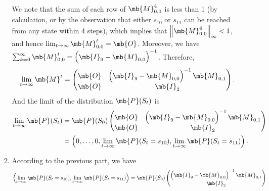 \begin{exercise}
\begin{enumerate}
\begin{solution}
\begin{enumerate}
\begin{align*}
                        \end{align*}
                        We note that the sum of each row of $\mb{M}_{0,0}^4$ is less than 1 (by calculation, or by the observation that either $s_{10}$ or $s_{11}$ can be reached from any state within 4 steps), which implies that $\left\|\mb{M}_{0,0}^4\right\|_\infty < 1$, and hence $\lim_{t\to\infty}\mb{M}_{0,0}^t = \mb{O}$. Moreover, we have $\sum_{k=0}^{\infty} \mb{M}_{0,0}^t = \left(\mb{I}_9 - \mb{M}_{0,0}\right)^{-1}$. Therefore,
                        \begin{align*}
                            \lim_{t\to\infty}\mb{M}^t =
                            \begin{pmatrix}
                                \mb{O} & \left(\mb{I}_9 - \mb{M}_{0,0}\right)^{-1}\mb{M}_{0,1} \\
                                \mb{O} & \mb{I}_2
                            \end{pmatrix}.
                        \end{align*}
                        And the limit of the distribution $\mb{P}(S_t)$ is
                        \begin{align*}
                            \lim_{t\to\infty}\mb{P}(S_t) & = \mb{P}(S_0)
                            \begin{pmatrix}
                                \mb{O} & \left(\mb{I}_9 - \mb{M}_{0,0}\right)^{-1}\mb{M}_{0,1} \\
                                \mb{O} & \mb{I}_2
                            \end{pmatrix}                                                                        \\
                                                         & = \left(0, \ldots, 0, \lim_{t\to\infty}\mb{P}(S_t=s_{10}), \lim_{t\to\infty}\mb{P}(S_t=s_{11})\right).
                        \end{align*}
                    \item According to the previous part, we have
                        \begin{align*}
                            \left(\lim_{t\to\infty}\mb{P}(S_t=s_{10}), \lim_{t\to\infty}\mb{P}(S_t=s_{11})\right) & = \mb{P}(S_0)
                            \begin{pmatrix}
                                \left(\mb{I}_9 - \mb{M}_{0,0}\right)^{-1}\mb{M}_{0,1} \\
                                \mb{I}_2
                            \end{pmatrix}                                                                                \\

\end{align*}
\end{enumerate}
\end{solution}
\end{enumerate}
\end{exercise}
